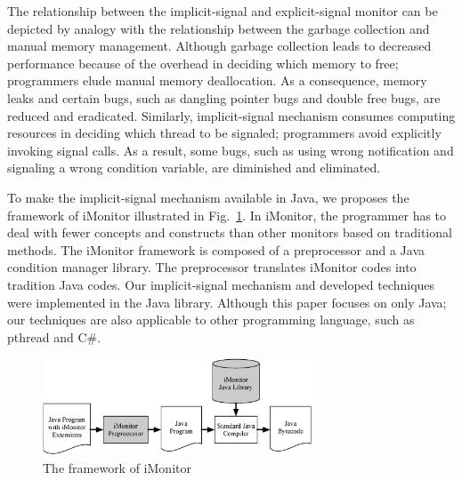 \documentclass[preprint]{sigplanconf}
\begin{document}
The relationship between the implicit-signal and explicit-signal monitor can be 
depicted by analogy with the relationship between the garbage collection and 
manual memory management. Although garbage collection leads to decreased
performance because of the overhead in deciding which memory to free; programmers 
elude manual memory deallocation. As a consequence, memory leaks and certain 
bugs, such as dangling pointer bugs and double free bugs, are reduced and 
eradicated. Similarly, implicit-signal mechanism consumes computing resources 
in deciding which thread to be signaled; programmers avoid explicitly invoking 
signal calls. As a result, some bugs, such as using wrong notification and
signaling a wrong condition variable, are diminished and eliminated. 

To make the implicit-signal mechanism available in Java, we proposes the 
framework of iMonitor illustrated in Fig.~\ref{fig:fw}. In iMonitor, the 
programmer has to deal with fewer concepts and constructs than other monitors 
based on traditional methods. The iMonitor framework is composed of a 
preprocessor and a Java condition manager library. The preprocessor translates 
iMonitor codes into tradition Java codes. Our implicit-signal mechanism and 
developed techniques were implemented in the Java library. Although this paper 
focuses on only Java; our techniques are also applicable to other programming 
language, such as pthread and C\#.  

%
\begin{figure}[ht!]
  \centering
  \includegraphics[width=80mm]{fig/flow.eps}
  \caption{The framework of iMonitor}
  \label{fig:fw}
\end{figure}
\end{document}
